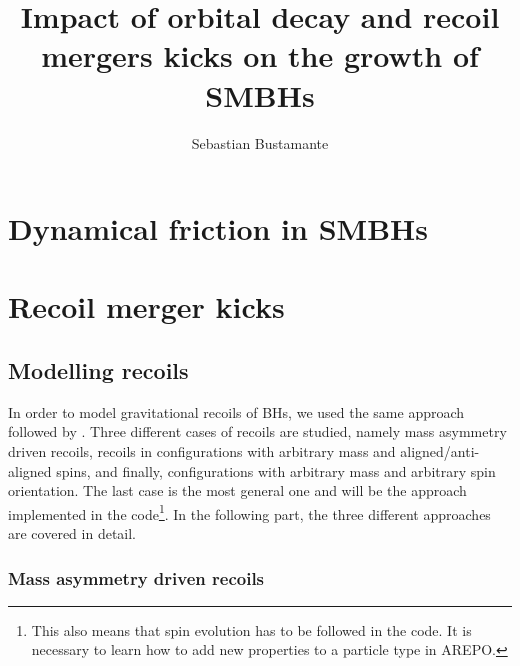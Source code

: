 \documentclass[a4,useAMS,usenatbib,usegraphicx,12pt]{article}
\title{Impact of orbital decay and recoil mergers kicks on the growth of SMBHs}
\author{Sebastian Bustamante}
\date{}
\begin{document}
\maketitle
\tableofcontents
 
\newpage 

\section{Dynamical friction in SMBHs}





\section{Recoil merger kicks}

\subsection{Modelling recoils}

In order to model gravitational recoils of BHs, we used the same approach followed by \citet{Sijacki2009}.
Three different cases of recoils are studied, namely mass asymmetry driven recoils, recoils in 
configurations with arbitrary mass and aligned/anti-aligned spins, and finally, configurations with
arbitrary mass and arbitrary spin orientation. The last case is the most general one and will be the 
approach implemented in the code\footnote{This also means that spin evolution has to be followed in 
the code. It is necessary to learn how to add new properties to a particle type in AREPO.}. In the
following part, the three different approaches are covered in detail.

\subsubsection{Mass asymmetry driven recoils}
\end{document}
